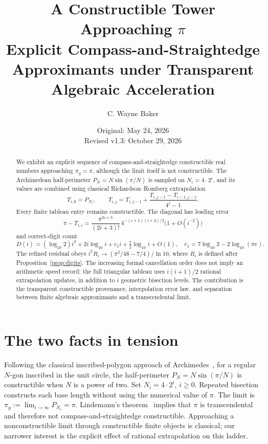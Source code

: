 \documentclass[11pt]{article}
\title{\textbf{A Constructible Tower Approaching $\pi$}\\\large Explicit Compass-and-Straightedge Approximants under Transparent Algebraic Acceleration}
\author{C. Wayne Baker}
\date{Original: May 24, 2026\\Revised v1.3: October 29, 2026}
\begin{document}
\maketitle
\begin{abstract}
We exhibit an explicit sequence of compass-and-straightedge constructible real numbers approaching $\pi_g=\pi$, although the limit itself is not constructible. The Archimedean half-perimeter $P_N=N\sin(\pi/N)$ is sampled on $N_i=4\cdot2^i$, and its values are combined using classical Richardson--Romberg extrapolation
\[
T_{i,0}=P_{N_i},\qquad T_{i,j}=T_{i,j-1}+\frac{T_{i,j-1}-T_{i-1,j-1}}{4^j-1}.
\]
Every finite tableau entry remains constructible. The diagonal has leading error
\[
\pi-T_{i,i}=\frac{\pi^{2i+3}}{(2i+3)!}\,4^{-(i+1)(i+4)/2}\bigl(1+O(i^{-2})\bigr)
\]
and correct-digit count
\[
D(i)=(\log_{10}2)i^2+2i\log_{10}i+c_1i+\tfrac72\log_{10}i+O(1),\quad
c_1=7\log_{10}2-2\log_{10}(\pi e).
\]
The refined residual obeys $i^2R_i\to(\pi^2/48-7/4)/\ln 10$, where $R_i$ is defined after Proposition~\ref{prop:digits}. The increasing formal cancellation order does not imply an arithmetic speed record: the full triangular tableau uses $i(i+1)/2$ rational extrapolation updates, in addition to $i$ geometric bisection levels. The contribution is the transparent constructible provenance, interpolation error law, and separation between finite algebraic approximants and a transcendental limit.
\end{abstract}
\section{The two facts in tension}
Following the classical inscribed-polygon approach of Archimedes~\cite{archimedes}, for a regular $N$-gon inscribed in the unit circle, the half-perimeter $P_N=N\sin(\pi/N)$ is constructible when $N$ is a power of two. Set $N_i=4\cdot2^i$, $i\ge0$. Repeated bisection constructs each base length without using the numerical value of $\pi$. The limit is $\pi_g:=\lim_{i\to\infty}P_{N_i}=\pi$. Lindemann's theorem~\cite{lindemann} implies that $\pi$ is transcendental and therefore not compass-and-straightedge constructible. Approaching a nonconstructible limit through constructible finite objects is classical; our narrower interest is the explicit effect of rational extrapolation on this ladder.
\end{document}
